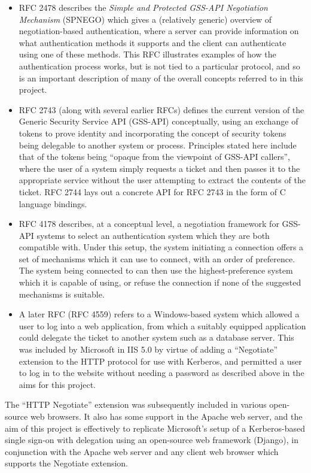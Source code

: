 \documentclass[12pt]{report}
\begin{document}
\begin{itemize}
\item
  RFC 2478\cite{RFC2478} describes the \textit{Simple and Protected GSS-API Negotiation Mechanism} (SPNEGO) which gives a (relatively generic) overview of negotiation-based authentication, where a server can provide information on what authentication methods it supports and the client can authenticate using one of these methods. This RFC illustrates examples of how the authentication process works, but is not tied to a particular protocol, and so is an important description of many of the overall concepts referred to in this project.
\item
  RFC 2743\cite{RFC2743} (along with several earlier RFCs) defines the current version of the Generic Security Service API (GSS-API) conceptually, using an exchange of tokens to prove identity and incorporating the concept of security tokens being delegable to another system or process. Principles stated here include that of the tokens being ``opaque from the viewpoint of GSS-API callers'', where the user of a system simply requests a ticket and then passes it to the appropriate service without the user attempting to extract the contents of the ticket. RFC 2744\cite{RFC2744} lays out a concrete API for RFC 2743 in the form of C language bindings.
\item
  RFC 4178\cite{RFC4178} describes, at a conceptual level, a negotiation framework for GSS-API systems to select an authentication system which they are both compatible with. Under this setup, the system initiating a connection offers a set of mechanisms which it can use to connect, with an order of preference. The system being connected to can then use the highest-preference system which it is capable of using, or refuse the connection if none of the suggested mechanisms is suitable.
\item
  A later RFC (RFC 4559\cite{RFC4559}) refers to a Windows-based system which allowed a user to log into a web application, from which a suitably equipped application could delegate the ticket to another system such as a database server. This was included by Microsoft in IIS 5.0 by virtue of adding a ``Negotiate'' extension to the HTTP protocol for use with Kerberos, and permitted a user to log in to the website without needing a password as described above in the aims for this project.
\end{itemize}

The ``HTTP Negotiate'' extension was subsequently included in various open-source web browsers. It also has some support in the Apache web server, and the aim of this project is effectively to replicate Microsoft's setup of a Kerberos-based single sign-on with delegation using an open-source web framework (Django), in conjunction with the Apache web server and any client web browser which supports the Negotiate extension.
\end{document}
